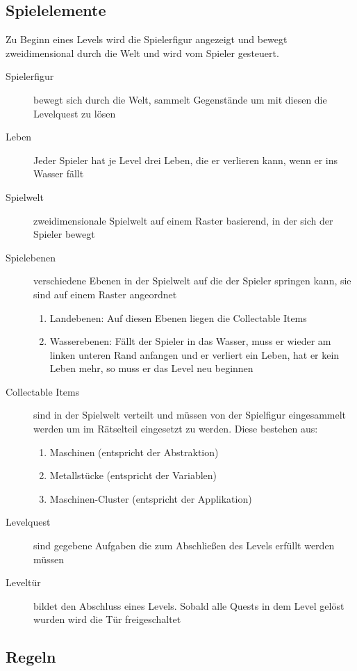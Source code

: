 \documentclass{scrartcl}
\begin{document}
\subsection{Spielelemente}

Zu Beginn eines Levels wird die Spielerfigur angezeigt und bewegt zweidimensional durch die Welt und wird vom Spieler gesteuert.

\begin{description}
	\item[Spielerfigur] bewegt sich durch die Welt, sammelt Gegenstände um mit diesen die Levelquest zu lösen
	\item[Leben] Jeder Spieler hat je Level drei Leben, die er verlieren kann, wenn er ins Wasser fällt
	\item[Spielwelt] zweidimensionale Spielwelt auf einem Raster basierend, in der sich der Spieler bewegt
	\item[Spielebenen] verschiedene Ebenen in der Spielwelt auf die der Spieler springen kann, sie sind auf einem Raster angeordnet
		\begin{enumerate}[label=\arabic*]
			\item Landebenen: Auf diesen Ebenen liegen die Collectable Items
			\item Wasserebenen: Fällt der Spieler in das Wasser, muss er wieder am linken unteren Rand anfangen und er verliert ein Leben, hat er kein Leben mehr, so muss er das Level neu beginnen
		\end{enumerate}
	\item[Collectable Items] \label{elemente:collectable}sind in der Spielwelt verteilt und müssen von der Spielfigur eingesammelt werden um im Rätselteil eingesetzt zu werden. Diese bestehen aus:
	\begin{enumerate}[label=\arabic*]
		\item Maschinen (entspricht der Abstraktion)
		\item Metallstücke (entspricht der Variablen)
		\item Maschinen-Cluster (entspricht der Applikation)
	\end{enumerate}
	\item[Levelquest] sind gegebene Aufgaben die zum Abschließen des Levels erfüllt werden müssen
	\item[Leveltür] bildet den Abschluss eines Levels. Sobald alle Quests in dem Level gelöst wurden wird die Tür freigeschaltet
\end{description}

\subsection{Regeln}
\end{document}

